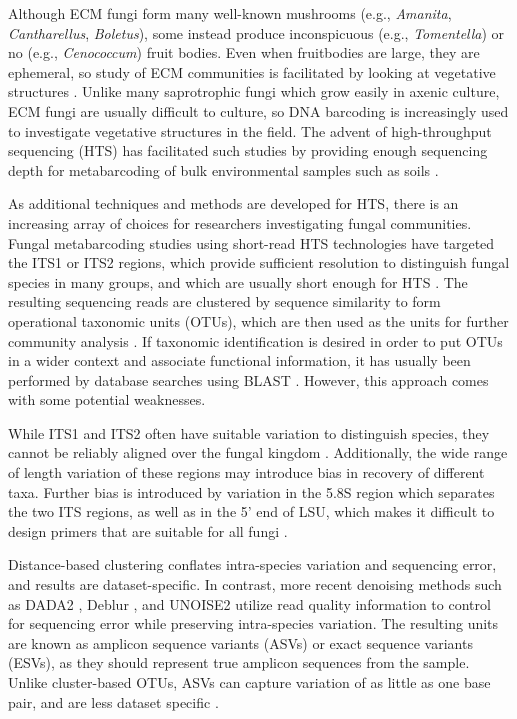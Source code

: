 \documentclass[
  12pt,
]{article}
\begin{document}
Although ECM fungi form many well-known mushrooms (e.g., \emph{Amanita}, \emph{Cantharellus}, \emph{Boletus}), some instead produce inconspicuous (e.g., \emph{Tomentella}) or no (e.g., \emph{Cenococcum}) fruit bodies.
Even when fruitbodies are large, they are ephemeral, so study of ECM communities is facilitated by looking at vegetative structures \autocite{horton2001}.
Unlike many saprotrophic fungi which grow easily in axenic culture, ECM fungi are usually difficult to culture, so DNA barcoding is increasingly used to investigate vegetative structures in the field.
The advent of high-throughput sequencing (HTS) has facilitated such studies by providing enough sequencing depth for metabarcoding of bulk environmental samples such as soils \autocite{Lindahl2013}.

As additional techniques and methods are developed for HTS, there is an increasing array of choices for researchers investigating fungal communities.
Fungal metabarcoding studies using short-read HTS technologies have targeted the ITS1 or ITS2 regions, which provide sufficient resolution to distinguish fungal species in many groups, and which are usually short enough for HTS \autocite{schoch2012,Lindahl2013}.
The resulting sequencing reads are clustered by sequence similarity to form operational taxonomic units (OTUs), which are then used as the units for further community analysis \autocite{Lindahl2013}.
If taxonomic identification is desired in order to put OTUs in a wider context and associate functional information, it has usually been performed by database searches using BLAST \autocite{altschul1990,Lindahl2013}.
However, this approach comes with some potential weaknesses.

While ITS1 and ITS2 often have suitable variation to distinguish species, they cannot be reliably aligned over the fungal kingdom \autocite{Lindahl2013,Tedersoo2018}.
Additionally, the wide range of length variation of these regions may introduce bias in recovery of different taxa.
Further bias is introduced by variation in the 5.8S region which separates the two ITS regions, as well as in the 5' end of LSU, which makes it difficult to design primers that are suitable for all fungi \autocite{tedersoo2015}.

Distance-based clustering conflates intra-species variation and sequencing error, and results are dataset-specific.
In contrast, more recent denoising methods such as DADA2 \autocite{callahan2017}, Deblur \autocite{amir2017}, and UNOISE2 \autocite{edgar2016} utilize read quality information to control for sequencing error while preserving intra-species variation.
The resulting units are known as amplicon sequence variants (ASVs) or exact sequence variants (ESVs), as they should represent true amplicon sequences from the sample.
Unlike cluster-based OTUs, ASVs can capture variation of as little as one base pair, and are less dataset specific \autocite{callahan2017}.
\end{document}
